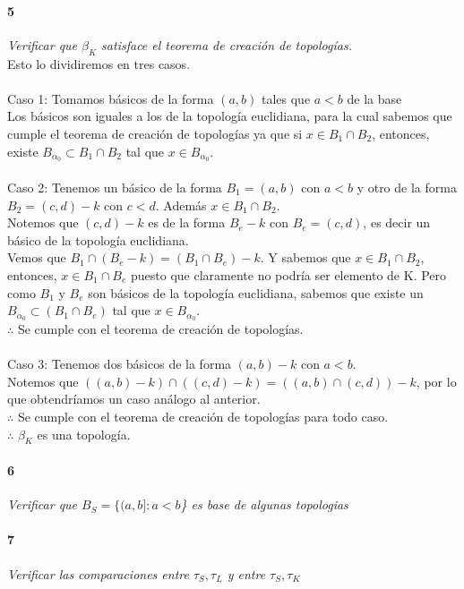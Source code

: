 \documentclass[12pt]{article}
\begin{document}
\paragraph{5}
\textit{Verificar que $\beta_K$ satisface el teorema de creación de topologías.}
\\Esto lo dividiremos en tres casos.\\
\\Caso 1: Tomamos básicos de la forma \((a,b)\) tales que \(a<b\) de la base
\\Los básicos son iguales a los de la topología euclidiana, para la cual sabemos que cumple el teorema de creación de topologías ya que si \(x\in B_1 \cap B_2\), entonces, existe \(B_{\alpha_0} \subset B_1 \cap B_2\) tal que \(x\in B_{\alpha_0}\).\\
\\Caso 2: Tenemos un básico de la forma \(B_1=(a,b)\) con \(a<b\) y otro de la forma \(B_2=(c,d)-k\) con \(c<d\). Además \(x\in B_1 \cap B_2\).
\\Notemos que \((c,d)-k\) es de la forma \(B_e-k\) con \(B_e=(c,d)\), es decir un básico de la topología euclidiana.
\\Vemos que \(B_1\cap(B_e-k)=(B_1\cap B_e)-k\). Y sabemos que \(x\in B_1 \cap B_2\), entonces, \(x\in B_1 \cap B_e\) puesto que claramente no podría ser elemento de K. Pero como \(B_1\) y \(B_e\) son básicos de la topología euclidiana, sabemos que existe un \(B_{\alpha_0} \subset (B_1\cap B_e)\) tal que \(x\in B_{\alpha_0}\).
\\\(\therefore\) Se cumple con el teorema de creación de topologías.\\
\\Caso 3: Tenemos dos básicos de la forma \((a,b)-k\) con \(a<b\).
\\Notemos que \(((a,b)-k)\cap((c,d)-k)=((a,b)\cap(c,d))-k\), por lo que obtendríamos un caso análogo al anterior. 
\\\(\therefore\) Se cumple con el teorema de creación de topologías para todo caso.
\\\(\therefore\) $\beta_K$ es una topología.
\paragraph{6}
\textit{Verificar que $B_S=\{(a,b]:a<b$\} es base de algunas topologias}

\paragraph{7}
\textit{Verificar las comparaciones entre $\tau_S, \tau_L$ y entre $\tau_S, \tau_K$}
\end{document}
